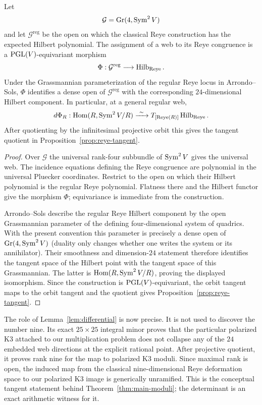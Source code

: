 \begin{proposition}
\label{prop:web-hilbert-bridge}
Let
\[
 \mathcal G=\operatorname{Gr}(4,\operatorname{Sym}^2V)
\]
and let \(\mathcal G^{\mathrm{reg}}\) be the open on which the classical
Reye construction has the expected Hilbert polynomial.  The assignment
of a web to its Reye congruence is a \(\operatorname{PGL}(V)\)-equivariant morphism
\[
 \Phi:\mathcal G^{\mathrm{reg}}
 \longrightarrow \operatorname{Hilb}_{\mathrm{Reye}}.
\]
Under the Grassmannian parameterization of the regular Reye locus in
Arrondo--Sols, \(\Phi\) identifies a dense open of
\(\mathcal G^{\mathrm{reg}}\) with the corresponding
\(24\)-dimensional Hilbert component.  In particular, at a general
regular web,
\[
 d\Phi_R:
 \operatorname{Hom}(R,\operatorname{Sym}^2V/R)
 \xrightarrow{\ \sim\ }
 T_{[\operatorname{Reye}(R)]}\operatorname{Hilb}_{\mathrm{Reye}}.
\]
After quotienting by the infinitesimal projective orbit this gives
the tangent quotient in Proposition~\ref{prop:reye-tangent}.
\end{proposition}

\begin{proof}
Over \(\mathcal G\) the universal rank-four subbundle of
\(\operatorname{Sym}^2V\) gives the universal web.  The incidence equations defining
the Reye congruence are polynomial in the universal Pluecker
coordinates.  Restrict to the open on which their Hilbert polynomial
is the regular Reye polynomial.  Flatness there and the Hilbert
functor give the morphism \(\Phi\); equivariance is immediate from
the construction.

Arrondo--Sols describe the regular Reye Hilbert component by the open
Grassmannian parameter of the defining four-dimensional system of
quadrics.  With the present convention this parameter is precisely a
dense open of \(\operatorname{Gr}(4,\operatorname{Sym}^2V)\) (duality only changes whether one
writes the system or its annihilator).  Their smoothness and
dimension-\(24\) statement therefore identifies the tangent space of
the Hilbert point with the tangent space of this Grassmannian.  The
latter is \(\operatorname{Hom}(R,\operatorname{Sym}^2V/R)\), proving the displayed isomorphism.
Since the construction is \(\operatorname{PGL}(V)\)-equivariant, the orbit tangent
maps to the orbit tangent and the quotient gives
Proposition~\ref{prop:reye-tangent}.
\end{proof}

The role of Lemma~\ref{lem:differential} is now precise.  It is not
used to discover the number nine.  Its exact $25\times25$ integral
minor proves that the particular polarized K3 attached to our
multiplication problem does not collapse any of the $24$ embedded
web directions at the explicit rational point.  After projective
quotient, it proves rank nine for the map to polarized K3 moduli.
Since maximal rank is open, the induced map from the classical
nine-dimensional Reye deformation space to our polarized K3 image is
generically unramified.  This is the conceptual tangent statement
behind Theorem~\ref{thm:main-moduli}; the determinant is an exact
arithmetic witness for it.

